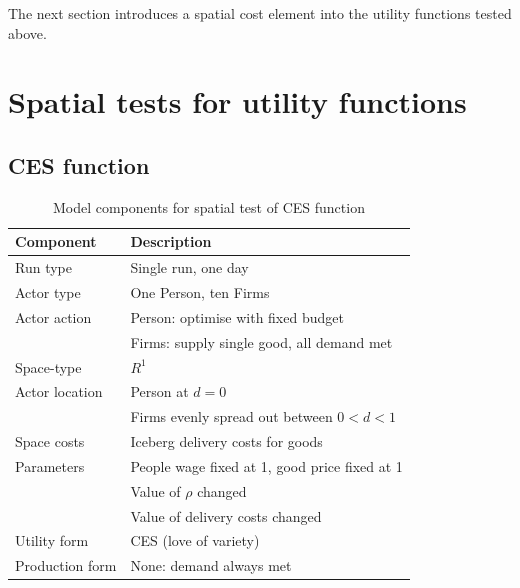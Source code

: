 The next section introduces a spatial cost element into the utility functions tested above.

\section{Spatial tests for utility functions \label{sec:utilspace}}

\subsection{CES function \label{sec:cesspace}}

%
\renewcommand{\arraystretch}{1.2}
\begin{table}[!hbt]
\begin{center}

\begin{tabular}{|l|l|}
\hline 
\textbf{Component} & \textbf{Description}\\
\hline
Run type & Single run, one day\\
\hline
Actor type & One Person, ten Firms \\
\hline
Actor action & Person: optimise with fixed budget\\
& Firms: supply single good, all demand met\\
\hline
Space-type & $R^1$\\
\hline
Actor location & Person at $d=0$\\ 
& Firms evenly spread out between $0<d<1$\\
\hline
Space costs & Iceberg delivery costs for goods\\
\hline
Parameters & People wage fixed at 1, good price fixed at 1\\
& Value of $\rho$ changed\\
& Value of delivery costs changed\\
\hline
Utility form & CES (love of variety)\\
\hline
Production form & None: demand always met\\
\hline

\end{tabular}

\caption{Model components for spatial test of CES function \label{tab:cesspatial}}
\end{center}
\end{table}


